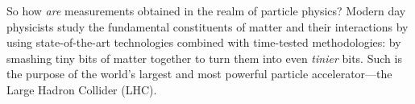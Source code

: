 So how \emph{are} measurements obtained in the realm of particle physics?
Modern day physicists study the fundamental constituents of matter and their interactions by using state-of-the-art technologies combined with time-tested methodologies:
by smashing tiny bits of matter together to turn them into even \emph{tinier} bits.
Such is the purpose of the world's largest and most powerful particle accelerator---the Large Hadron Collider (LHC).

